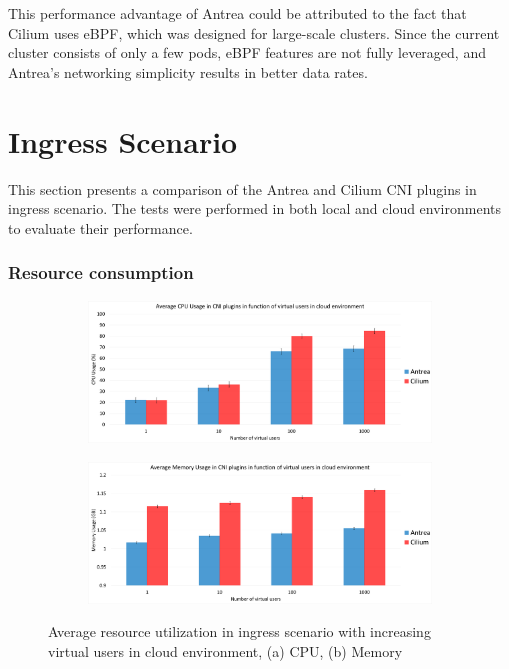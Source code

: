 This performance advantage of Antrea could be attributed to the fact that Cilium uses eBPF, which was designed for large-scale clusters. Since the current cluster consists of only a few pods, eBPF features are not fully leveraged, and Antrea's networking simplicity results in better data rates.

\section{Ingress Scenario}
\label{sec:ingressComparison}

This section presents a comparison of the Antrea and Cilium CNI plugins in ingress scenario. The tests were performed in both local and cloud environments to evaluate their performance.

\subsubsection{Resource consumption}
\label{sec:ingressResoureComsumption}


\begin{figure}[H]
    \centering
    \begin{subfigure}[b]{1\textwidth}
        \includegraphics[width=\textwidth]{plots/traffic-splitting/cpu_cloud.png}
        \caption{}
        \label{fig:cpu_cloud_avg}
    \end{subfigure}
    \begin{subfigure}[b]{1\textwidth}
        \includegraphics[width=\textwidth]{plots/traffic-splitting/memory_cloud.png}
        \caption{}
        \label{fig:memory_cloud_avg}
    \end{subfigure}
    
    \caption{Average resource utilization in ingress scenario with increasing virtual users in cloud environment, (a) CPU, (b) Memory}
    \label{fig:resource_cloud_avg}
\end{figure}


